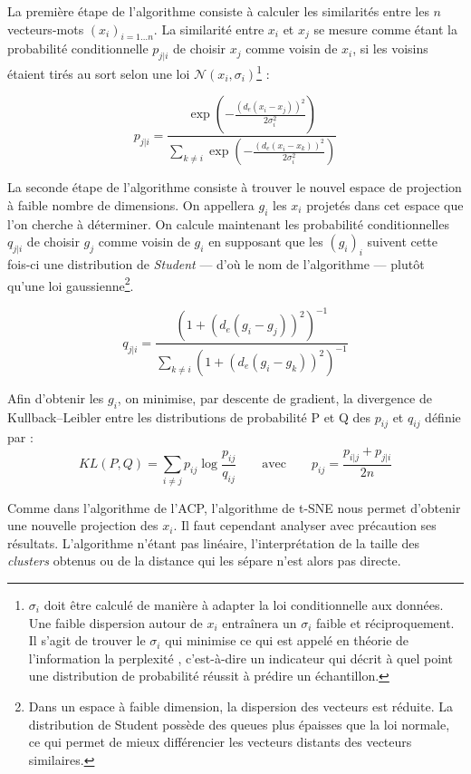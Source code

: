 \documentclass[11pt,french,french]{article}
\let\rmarkdownfootnote\footnote%
\def\footnote{\protect\rmarkdownfootnote}
\begin{document}
La première étape de l'algorithme consiste à calculer les similarités
entre les \(n\) vecteurs-mots \((x_i)_{i=1...n}\). La similarité entre
\(x_i\) et \(x_j\) se mesure comme étant la probabilité conditionnelle
\(p_{j|i}\) de choisir \(x_j\) comme voisin de \(x_i\), si les voisins
étaient tirés au sort selon une loi
\(\mathcal{N}(x_i, \sigma_i)\)\footnote{\(\sigma_i\) doit être calculé
  de manière à adapter la loi conditionnelle aux données. Une faible
  dispersion autour de \(x_i\) entraînera un \(\sigma_i\) faible et
  réciproquement. Il s'agit de trouver le \(\sigma_i\) qui minimise ce
  qui est appelé en théorie de l'information la \og perplexité \fg{},
  c'est-à-dire un indicateur qui décrit à quel point une distribution de
  probabilité réussit à prédire un échantillon.} :

\[ p_{j|i} = \frac{
\exp\left(-\frac{(d_e(x_i - x_j))^2}{2\sigma_i^2}\right)
}{
\sum_{k \neq i}
\exp\left(-\frac{(d_e(x_i - x_k))^2}{2\sigma_i^2}\right)
}\]

La seconde étape de l'algorithme consiste à trouver le nouvel espace de
projection à faible nombre de dimensions. On appellera \(g_i\) les
\(x_i\) projetés dans cet espace que l'on cherche à déterminer. On
calcule maintenant les probabilité conditionnelles \(q_{j|i}\) de
choisir \(g_j\) comme voisin de \(g_i\) en supposant que les \((g_i)_i\)
suivent cette fois-ci une distribution de \emph{Student} --- d'où le nom
de l'algorithme --- plutôt qu'une loi gaussienne\footnote{Dans un espace
  à faible dimension, la dispersion des vecteurs est réduite. La
  distribution de Student possède des queues plus épaisses que la loi
  normale, ce qui permet de mieux différencier les vecteurs distants des
  vecteurs similaires.}.

\[ q_{j|i} = \frac{(1+ (d_e(g_i - g_j))^2)^{-1}}{\sum_{k \neq i}{(1+ (d_e(g_i - g_k))^2)^{-1}}}\]

Afin d'obtenir les \(g_i\), on minimise, par descente de gradient, la
divergence de Kullback--Leibler entre les distributions de probabilité P
et Q des \(p_{ij}\) et \(q_{ij}\) définie par :
\[KL(P,Q) = \sum_{i \neq j} { p_{ij} \log{\frac{p_{ij}}{q_{ij}}}} \qquad\text{avec}\qquad p_{ij} = \frac{p_{i|j} + p_{j|i}}{2n}\]

Comme dans l'algorithme de l'ACP, l'algorithme de t-SNE nous permet
d'obtenir une nouvelle projection des \(x_i\). Il faut cependant
analyser avec précaution ses résultats. L'algorithme n'étant pas
linéaire, l'interprétation de la taille des \emph{clusters} obtenus ou
de la distance qui les sépare n'est alors pas directe.
\end{document}
